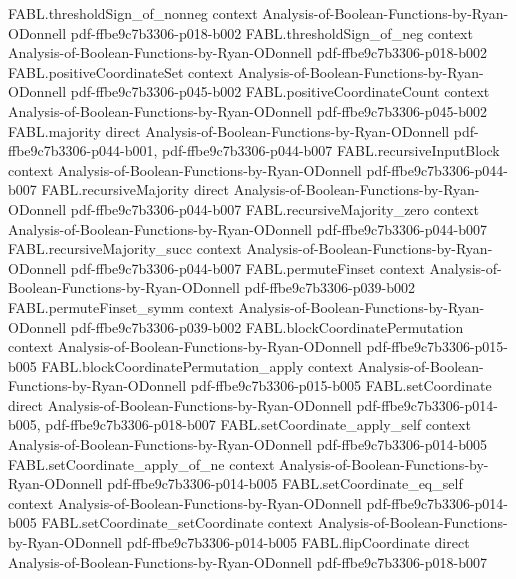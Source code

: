 \begin{theorem}
  {FABL.thresholdSign_of_nonneg}
  {context}
  {Analysis-of-Boolean-Functions-by-Ryan-ODonnell}
  {pdf-ffbe9c7b3306-p018-b002}
\proofstep
  {FABL.thresholdSign_of_neg}
  {context}
  {Analysis-of-Boolean-Functions-by-Ryan-ODonnell}
  {pdf-ffbe9c7b3306-p018-b002}
\proofstep
  {FABL.positiveCoordinateSet}
  {context}
  {Analysis-of-Boolean-Functions-by-Ryan-ODonnell}
  {pdf-ffbe9c7b3306-p045-b002}
\proofstep
  {FABL.positiveCoordinateCount}
  {context}
  {Analysis-of-Boolean-Functions-by-Ryan-ODonnell}
  {pdf-ffbe9c7b3306-p045-b002}
\proofstep
  {FABL.majority}
  {direct}
  {Analysis-of-Boolean-Functions-by-Ryan-ODonnell}
  {pdf-ffbe9c7b3306-p044-b001,
    pdf-ffbe9c7b3306-p044-b007}
\proofstep
  {FABL.recursiveInputBlock}
  {context}
  {Analysis-of-Boolean-Functions-by-Ryan-ODonnell}
  {pdf-ffbe9c7b3306-p044-b007}
\proofstep
  {FABL.recursiveMajority}
  {direct}
  {Analysis-of-Boolean-Functions-by-Ryan-ODonnell}
  {pdf-ffbe9c7b3306-p044-b007}
\proofstep
  {FABL.recursiveMajority_zero}
  {context}
  {Analysis-of-Boolean-Functions-by-Ryan-ODonnell}
  {pdf-ffbe9c7b3306-p044-b007}
\proofstep
  {FABL.recursiveMajority_succ}
  {context}
  {Analysis-of-Boolean-Functions-by-Ryan-ODonnell}
  {pdf-ffbe9c7b3306-p044-b007}
\proofstep
  {FABL.permuteFinset}
  {context}
  {Analysis-of-Boolean-Functions-by-Ryan-ODonnell}
  {pdf-ffbe9c7b3306-p039-b002}
\proofstep
  {FABL.permuteFinset_symm}
  {context}
  {Analysis-of-Boolean-Functions-by-Ryan-ODonnell}
  {pdf-ffbe9c7b3306-p039-b002}
\proofstep
  {FABL.blockCoordinatePermutation}
  {context}
  {Analysis-of-Boolean-Functions-by-Ryan-ODonnell}
  {pdf-ffbe9c7b3306-p015-b005}
\proofstep
  {FABL.blockCoordinatePermutation_apply}
  {context}
  {Analysis-of-Boolean-Functions-by-Ryan-ODonnell}
  {pdf-ffbe9c7b3306-p015-b005}
\proofstep
  {FABL.setCoordinate}
  {direct}
  {Analysis-of-Boolean-Functions-by-Ryan-ODonnell}
  {pdf-ffbe9c7b3306-p014-b005,
    pdf-ffbe9c7b3306-p018-b007}
\proofstep
  {FABL.setCoordinate_apply_self}
  {context}
  {Analysis-of-Boolean-Functions-by-Ryan-ODonnell}
  {pdf-ffbe9c7b3306-p014-b005}
\proofstep
  {FABL.setCoordinate_apply_of_ne}
  {context}
  {Analysis-of-Boolean-Functions-by-Ryan-ODonnell}
  {pdf-ffbe9c7b3306-p014-b005}
\proofstep
  {FABL.setCoordinate_eq_self}
  {context}
  {Analysis-of-Boolean-Functions-by-Ryan-ODonnell}
  {pdf-ffbe9c7b3306-p014-b005}
\proofstep
  {FABL.setCoordinate_setCoordinate}
  {context}
  {Analysis-of-Boolean-Functions-by-Ryan-ODonnell}
  {pdf-ffbe9c7b3306-p014-b005}
\proofstep
  {FABL.flipCoordinate}
  {direct}
  {Analysis-of-Boolean-Functions-by-Ryan-ODonnell}
  {pdf-ffbe9c7b3306-p018-b007}

\end{theorem}
